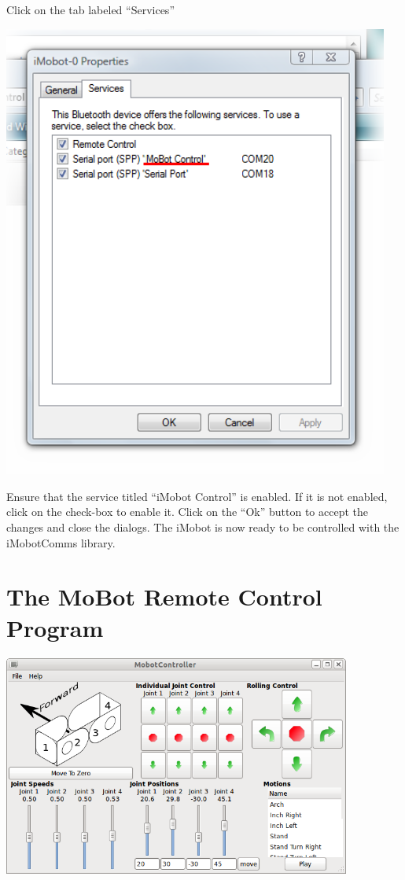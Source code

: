 \documentclass{article}
\begin{document}
Click on the tab labeled ``Services''

\begin{center}
\includegraphics[width=5in]{images/imobot_connect_8.png}
\end{center}

Ensure that the service titled ``iMobot Control'' is enabled. If it is not
enabled, click on the check-box to enable it. Click on the ``Ok'' button to
accept the changes and close the dialogs. The iMobot is now ready to be
controlled with the iMobotComms library.

\section{ The MoBot Remote Control Program }
\includegraphics[width=4.5in]{images/iMobot_controller_screenshot.png}
\end{document}
